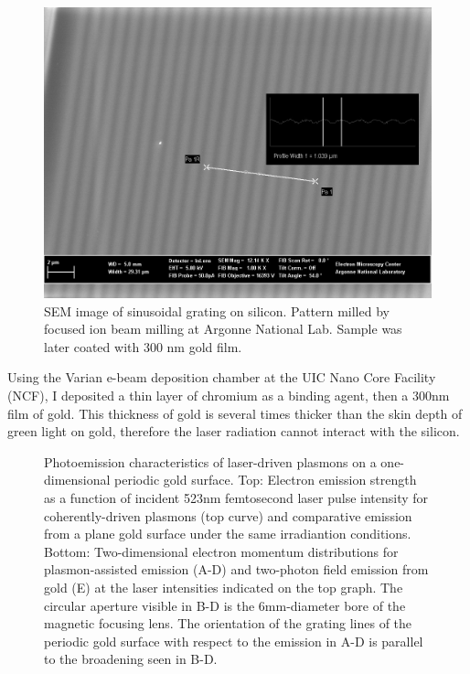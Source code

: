\begin{figure}
  \centering
  \includegraphics{HighMagSEM.jpg}
  \caption[SEM image of sinusoidal grating on silicon]{
    SEM image of sinusoidal grating on silicon.
    Pattern milled by focused ion beam milling at Argonne National Lab.
    Sample was later coated with 300 nm gold film.
  }
  \label{fig:fib-si-sem}
\end{figure}

Using the Varian e-beam deposition chamber at the UIC Nano Core Facility (NCF), I deposited a thin layer of chromium as a binding agent, then a 300nm film of gold.
This thickness of gold is several times thicker than the skin depth of green light on gold, therefore the laser radiation cannot interact with the silicon.

\begin{figure}
  \centering
  
  \caption[Photoemission characteristics of laser-driven plasmons on a one-dimensional periodic gold surface]{
    Photoemission characteristics of laser-driven plasmons on a one-dimensional periodic gold surface.
    Top: Electron emission strength as a function of incident 523nm femtosecond laser pulse intensity for coherently-driven plasmons (top curve)
      and comparative emission from a plane gold surface under the same irradiantion conditions.
    Bottom: Two-dimensional electron momentum distributions for plasmon-assisted emission (A-D) and two-photon field emission from gold (E) at the laser intensities indicated on the top graph.
    The circular aperture visible in B-D is the 6mm-diameter bore of the magnetic focusing lens.
    The orientation of the grating lines of the periodic gold surface with respect to the emission in A-D is parallel to the broadening seen in B-D.
  }
  \label{fig:pape}
\end{figure}

